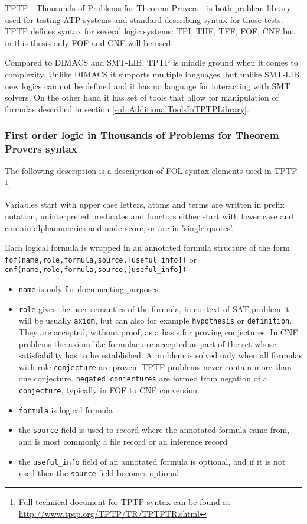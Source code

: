 TPTP \cite{Sut17} - Thousands of Problems for Theorem Provers - is both problem library used for testing \gls{ATP} systems and standard describing syntax for those tests. 
TPTP defines syntax for several logic systems: \gls{TPI}, \gls{THF}, \gls{TFF}, \gls{FOF}, \gls{CNF} but in this thesis only \gls{FOF} and \gls{CNF} will be used.

Compared to DIMACS and SMT-LIB, TPTP is middle ground when it comes to complexity. Unlike DIMACS it supports multiple languages, but unlike SMT-LIB, new logics can not be defined and it has no language for interacting with SMT solvers. On the other hand it has set of tools that allow for manipulation of formulas described in section \ref{sub:AdditionalToolsInTPTPLibrary}. 

\subsubsection{First order logic in Thousands of Problems for Theorem Provers syntax}

The following description is a description of \gls{FOL} syntax elements used in \gls{TPTP} \footnote{Full technical document for TPTP syntax can be found at \url{http://www.tptp.org/TPTP/TR/TPTPTR.shtml}}.

Variables start with upper case letters, atoms and terms are written in prefix notation, uninterpreted predicates and functors either start with lower case and contain alphanumerics and underscore, or are in 'single quotes'.

Each logical formula is wrapped in an annotated formula structure of the form \texttt{fof(name,role,formula,source,[useful_info])} or \texttt{cnf(name,role,formula,source,[useful_info])}

\begin{itemize}
  \item \texttt{name} is only for documenting purposes
  \item \texttt{role} gives the user semantics of the formula, in context of SAT problem it will be usually \texttt{axiom}, but can also for example \texttt{hypothesis} or \texttt{definition}. They are accepted, without proof, as a basis for proving conjectures. In CNF problems the axiom-like formulae are accepted as part of the set whose satisfiability has to be established. A problem is solved only when all formulas with role \texttt{conjecture} are proven. TPTP problems never contain more than one conjecture. \texttt{negated_conjectures} are formed from negation of a \texttt{conjecture}, typically in FOF to CNF conversion.
  \item \texttt{formula} is logical formula
  \item the \texttt{source} field is used to record where the annotated formula came from, and is most commonly a file record or an inference record
  \item the \texttt{useful_info} field of an annotated formula is optional, and if it is not used then the \texttt{source} field becomes optional
\end{itemize}

